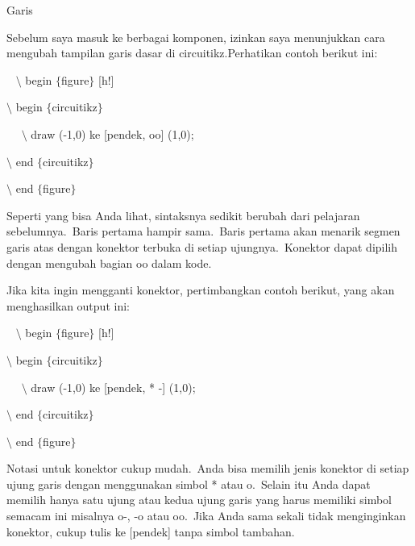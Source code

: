 \noindent 
Garis
\par


\noindent 
Sebelum saya masuk ke berbagai komponen, izinkan saya menunjukkan cara mengubah tampilan garis dasar di circuitikz.Perhatikan contoh berikut ini:
\par


\noindent 
~ $\setminus$ begin $ \{ $figure$ \} $ [h!]
\par


\noindent 
 $\setminus$ begin $ \{ $circuitikz$ \} $
\par


\noindent 
~~ $\setminus$ draw (-1,0) ke [pendek, oo] (1,0);
\par


\noindent 
 $\setminus$ end $ \{ $circuitikz$ \} $
\par


\noindent 
 $\setminus$ end $ \{ $figure$ \} $ 
\par


\noindent 
Seperti yang bisa Anda lihat, sintaksnya sedikit berubah dari pelajaran sebelumnya. Baris pertama hampir sama. Baris pertama akan menarik segmen garis atas dengan konektor terbuka di setiap ujungnya. Konektor dapat dipilih dengan mengubah bagian oo dalam kode.
\par


\noindent 
Jika kita ingin mengganti konektor, pertimbangkan contoh berikut, yang akan menghasilkan output ini:
\par


\noindent 
~ $\setminus$ begin $ \{ $figure$ \} $ [h!]
\par


\noindent 
 $\setminus$ begin $ \{ $circuitikz$ \} $
\par


\noindent 
~~ $\setminus$ draw (-1,0) ke [pendek, * -] (1,0);
\par


\noindent 
 $\setminus$ end $ \{ $circuitikz$ \} $
\par


\noindent 
 $\setminus$ end $ \{ $figure$ \} $ 
\par


\noindent 
Notasi untuk konektor cukup mudah. Anda bisa memilih jenis konektor di setiap ujung garis dengan menggunakan simbol * atau o. Selain itu Anda dapat memilih hanya satu ujung atau kedua ujung garis yang harus memiliki simbol semacam ini misalnya o-, -o atau oo. Jika Anda sama sekali tidak menginginkan konektor, cukup tulis ke [pendek] tanpa simbol tambahan.
\par


